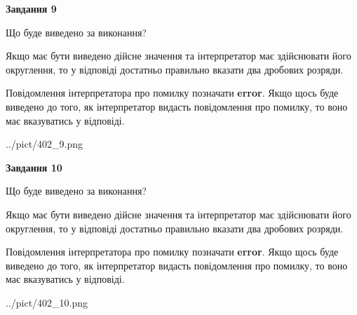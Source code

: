 \documentclass[12pt, ukrainian]{article}
\begin{document}
{\begin {Large}
{\begin {center}\textbf{Завдання 9}\end {center}}\par
Що буде виведено за виконання? \par

Якщо має бути виведено дійсне значення та інтерпретатор має здійснювати його округлення, 
то у відповіді достатньо правильно вказати два дробових розряди.

Повідомлення інтерпретатора про помилку позначати \textbf{error}.
Якщо щось буде виведено до того, як інтерпретатор видасть повідомлення про помилку, 
то воно має вказуватись у відповіді. \par

\begin{center}
	{../pict/402_9.png}
\end{center}
\newpage

{\begin {center}\textbf{Завдання 10}\end {center}}\par
Що буде виведено за виконання? \par

Якщо має бути виведено дійсне значення та інтерпретатор має здійснювати його округлення, 
то у відповіді достатньо правильно вказати два дробових розряди.

Повідомлення інтерпретатора про помилку позначати \textbf{error}.
Якщо щось буде виведено до того, як інтерпретатор видасть повідомлення про помилку, 
то воно має вказуватись у відповіді. \par

\begin{center}
	{../pict/402_10.png}
\end{center}
\newpage

\end {Large}}
\end{document}
